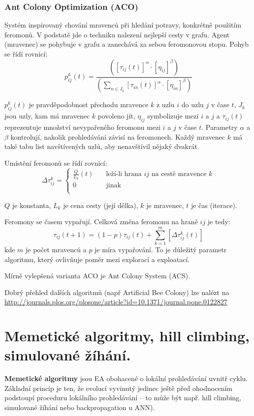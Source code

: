 \subsubsection{Ant Colony Optimization (ACO)}
Systém inspirovaný chování mravenců při hledání potravy, konkrétně použitím feromonů. V podstatě jde o techniku nalezení nejlepší cesty v grafu. Agent (mravenec) se pohybuje v grafu a zanechává za sebou feromonovou stopu. Pohyb se řídí rovnicí:
$$p^k_{ij}(t) = \frac{([\tau_{ij}(t)]^\alpha \cdot [\eta_{ij}]^\beta)}{(\sum\limits_{n \in J_k}[\tau_{in}(t)]^\alpha \cdot [\eta_{in}]^\beta)}$$

$p^k_{ij}(t)$ je pravděpodobnost přechodu mravence $k$ z uzlu $i$ do uzlu $j$ v čase $t$, $J_k$ jsou uzly, kam má mravenec $k$ povoleno jít, $\eta_{ij}$ symbolizuje  mezi $i$ a $j$ a $\tau_{ij}(t)$ reprezentuje množství nevypařeného feromonu mezi $i$ a $j$ v čase $t$. Parametry $\alpha$ a $\beta$ kontrolují, nakolik prohledávání závisí na feromonech. Každý mravenec $k$ má také tabu list navštívených uzlů, aby nenavštívil nějaký dvakrát.

Umístění feromonů se řídí rovnicí:
\[
\Delta\tau^k_{ij} = 
\begin{cases}
	\frac{Q}{L_k}(t) 	& \quad \text{leží-li hrana $ij$ na cestě mravence $k$} \\
	0 					& \quad \text{jinak}\\
\end{cases}
\]

$Q$ je konstanta, $L_k$ je cena cesty (její délka), $k$ je mravenec, $t$ je čas (iterace).

Feromony se časem vypařují. Celková změna feromonu na hraně $ij$ je tedy:
$$\tau_{ij}(t+1) = (1-p)\tau_{ij}(t) + \sum_{k=1}^m [\Delta\tau^k_{ij}(t)]$$
kde $m$ je počet mravenců a $p$ je míra vypařování. To je důležitý parametr algoritmu, který ovlivňuje poměr mezi explorací a exploatací.

Mírně vylepšená varianta ACO je Ant Colony System (ACS).

Dobrý přehled dalších algoritmů (např Artificial Bee Colony) lze nalézt na \url{http://journals.plos.org/plosone/article?id=10.1371/journal.pone.0122827}






\section{Memetické algoritmy, hill climbing, simulované žíhání.}
\textbf{Memetické algoritmy} jsou EA obohacené o lokální prohledávání uvnitř cyklu. Základní princip je ten, že evolucí vyvinutý jedinec ještě před ohodnocením podstoupí proceduru lokálního prohledávání -- to může být např. hill climbing, simulované žíhání nebo backpropagation u ANN). 

